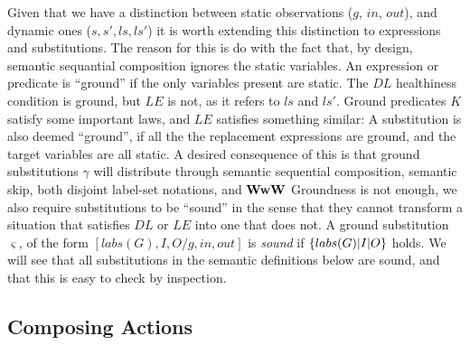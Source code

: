 Given that we have a distinction between static observations ($g$, $in$, $out$),
and dynamic ones ($s,s',ls,ls'$) it is worth extending this distinction
to expressions and substitutions.
The reason for this is do with the fact that, by design,
semantic sequantial composition ignores the static variables.
An expression or predicate is ``ground''
if the only variables present are static.
The $DL$ healthiness condition is ground,
but $LE$ is not, as it refers to $ls$ and $ls'$.
Ground predicates $K$ satisfy some important laws,
and $LE$ satisfies something similar:
 \noindent
A substitution is also deemed ``ground'',
if all the the replacement expressions are ground,
and the target variables are all static.
A desired consequence of this is that
ground substitutions $\gamma$
will distribute through semantic sequential composition,
semantic skip,
both disjoint label-set notations,
and $\mathbf{WwW}$
Groundness is not enough,
we also require substitutions to be ``sound'' in the sense that
they cannot transform a situation that satisfies $DL$
or $LE$ into one that does not.
A ground substitution $\varsigma$,
of the form $[labs(G),I,O/g,in,out]$ is \emph{sound}
if $\{{labs(G)|I|O}\}$ holds.
We will see that all substitutions in the semantic definitions
below are sound, and that this is easy to check by inspection.


\subsection{Composing Actions}\label{ssec:composing}

